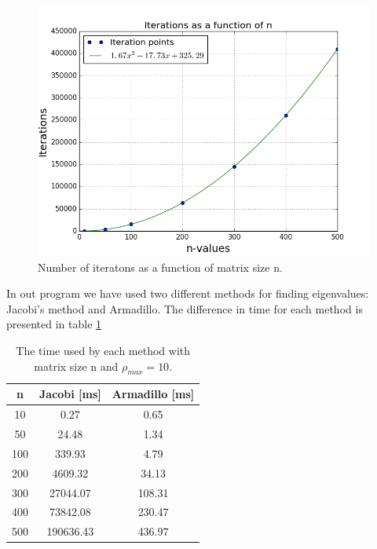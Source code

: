 \documentclass{article}
\begin{document}
\begin{figure}[H]
\centering
\includegraphics[scale=0.5]{../figures/iterations.png}
\caption{Number of iteratons as a function of matrix size n.}
\label{fig:iterations}
\end{figure}
In out program we have used two different methods for finding eigenvalues: Jacobi's method and Armadillo. The difference in time for each method is presented in table \ref{tab:time}
\begin{table}[H]
\centering
\begin{tabular}{c|c|c}
n & Jacobi [ms] & Armadillo [ms] \\ \hline
10 &  0.27 & 0.65        \\ \hline
50 &  24.48 & 1.34       \\ \hline
100 & 339.93 & 4.79      \\ \hline 
200 & 4609.32 & 34.13    \\ \hline
300 & 27044.07 & 108.31  \\ \hline
400 & 73842.08 & 230.47  \\ \hline
500 & 190636.43 & 436.97 \\ \hline
\end{tabular}
\caption{The time used by each method with matrix size n and $\rho_{max} = 10$.}
\label{tab:time}
\end{table}
\end{document}
